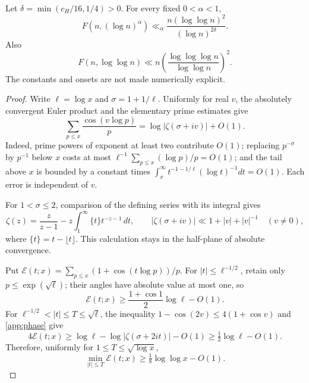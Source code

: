 \begin{proposition}\label{app:quantitative}
Let $\delta=\min(c_H/16,1/4)>0$. For every fixed $0<\alpha<1$,
\begin{equation}\label{app:rate}
 F(n,(\log n)^\alpha)
 \ll_\alpha\frac{n(\log\log n)^2}{(\log n)^{2\delta}}.
\end{equation}
Also
\begin{equation}\label{app:slowrate}
 F(n,\log\log n)\ll n\left(\frac{\log\log\log n}{\log\log n}\right)^2.
\end{equation}
The constants and onsets are not made numerically explicit.
\end{proposition}
\begin{proof}
Write $\ell=\log x$ and $\sigma=1+1/\ell$. Uniformly for real $v$, the absolutely convergent Euler product and the elementary prime estimates give
\begin{equation}\label{app:phase}
 \sum_{p\le x}\frac{\cos(v\log p)}p
          =\log|\zeta(\sigma+iv)|+O(1).
\end{equation}
Indeed, prime powers of exponent at least two contribute $O(1)$; replacing $p^{-\sigma}$ by $p^{-1}$ below $x$ costs at most $\ell^{-1}\sum_{p\le x}(\log p)/p=O(1)$; and the tail above $x$ is bounded by a constant times $\int_x^\infty t^{-1-1/\ell}(\log t)^{-1}dt=O(1)$. Each error is independent of $v$.

For $1<\sigma\le2$, comparison of the defining series with its integral gives
\[
 \zeta(z)=\frac z{z-1}-z\int_1^\infty\{t\}t^{-z-1}\,dt,
 \qquad |\zeta(\sigma+iv)|\ll1+|v|+|v|^{-1}\quad(v\ne0),
\]
where $\{t\}=t-\lfloor t\rfloor$. This calculation stays in the half-plane of absolute convergence.

Put $\mathcal E(t;x)=\sum_{p\le x}(1+\cos(t\log p))/p$. For $|t|\le\ell^{-1/2}$, retain only $p\le\exp(\sqrt\ell)$; their angles have absolute value at most one, so
\[
 \mathcal E(t;x)\ge\frac{1+\cos1}{2}\log\ell-O(1).
\]
For $\ell^{-1/2}<|t|\le T\le\sqrt\ell$, the inequality $1-\cos(2v)\le4(1+\cos v)$ and \eqref{app:phase} give
\[
 4\mathcal E(t;x)\ge\log\ell-\log|\zeta(\sigma+2it)|-O(1)
                 \ge\tfrac12\log\ell-O(1).
\]
Therefore, uniformly for $1\le T\le\sqrt{\log x}$,
\begin{equation}\label{app:distance}
 \min_{|t|\le T}\mathcal E(t;x)\ge\tfrac18\log\log x-O(1).
\end{equation}


\end{proof}
